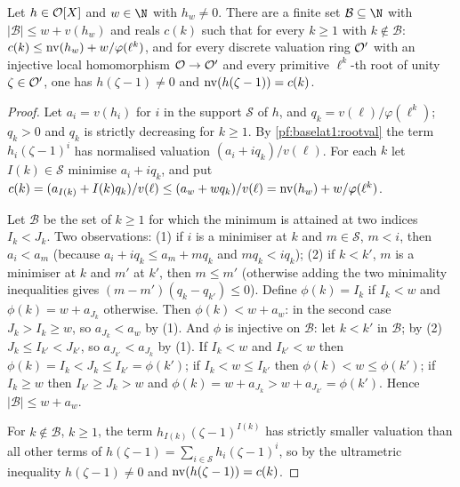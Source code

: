 \begin{proposition}\label{pf:baselat1:valroot}
Let $h\in\mathcal O[X]$ and $w\in\N$ with $h_w\ne0$. There are a finite set $\mathcal B\subseteq\N$ with
$|\mathcal B|\le w+v(h_w)$ and reals $c(k)$ such that for every $k\ge1$ with $k\notin\mathcal B$:
$c(k)\le\operatorname{nv}(h_w)+w/\varphi(\ell^k)$, and for every discrete valuation ring $\mathcal O'$ with an injective local
homomorphism $\mathcal O\to\mathcal O'$ and every primitive $\ell^k$-th root of unity $\zeta\in\mathcal O'$, one has
$h(\zeta-1)\ne0$ and $\operatorname{nv}(h(\zeta-1))=c(k)$.
\end{proposition}

\begin{proof}
Let $a_i=v(h_i)$ for $i$ in the support $\mathcal S$ of $h$, and $q_k=v(\ell)/\varphi(\ell^k)$; $q_k>0$ and $q_k$ is
strictly decreasing for $k\ge1$. By \cref{pf:baselat1:rootval} the term $h_i(\zeta-1)^i$ has normalised valuation
$(a_i+iq_k)/v(\ell)$. For each $k$ let $I(k)\in\mathcal S$ minimise $a_i+iq_k$, and put $c(k)=(a_{I(k)}+I(k)q_k)/v(\ell)\le
(a_w+wq_k)/v(\ell)=\operatorname{nv}(h_w)+w/\varphi(\ell^k)$.

Let $\mathcal B$ be the set of $k\ge1$ for which the minimum is attained at two indices $I_k<J_k$. Two observations: (1) if
$i$ is a minimiser at $k$ and $m\in\mathcal S$, $m<i$, then $a_i<a_m$ (because $a_i+iq_k\le a_m+mq_k$ and $mq_k<iq_k$);
(2) if $k<k'$, $m$ is a minimiser at $k$ and $m'$ at $k'$, then $m\le m'$ (otherwise adding the two minimality inequalities
gives $(m-m')(q_k-q_{k'})\le0$). Define $\phi(k)=I_k$ if $I_k<w$ and $\phi(k)=w+a_{J_k}$ otherwise. Then $\phi(k)<w+a_w$: in
the second case $J_k>I_k\ge w$, so $a_{J_k}<a_w$ by (1). And $\phi$ is injective on $\mathcal B$: let $k<k'$ in $\mathcal B$;
by (2) $J_k\le I_{k'}<J_{k'}$, so $a_{J_{k'}}<a_{J_k}$ by (1). If $I_k<w$ and $I_{k'}<w$ then $\phi(k)=I_k<J_k\le
I_{k'}=\phi(k')$; if $I_k<w\le I_{k'}$ then $\phi(k)<w\le\phi(k')$; if $I_k\ge w$ then $I_{k'}\ge J_k>w$ and
$\phi(k)=w+a_{J_k}>w+a_{J_{k'}}=\phi(k')$. Hence $|\mathcal B|\le w+a_w$.

For $k\notin\mathcal B$, $k\ge1$, the term $h_{I(k)}(\zeta-1)^{I(k)}$ has strictly smaller valuation than all other terms of
$h(\zeta-1)=\sum_{i\in\mathcal S}h_i(\zeta-1)^i$, so by the ultrametric inequality $h(\zeta-1)\ne0$ and
$\operatorname{nv}(h(\zeta-1))=c(k)$.
\end{proof}

